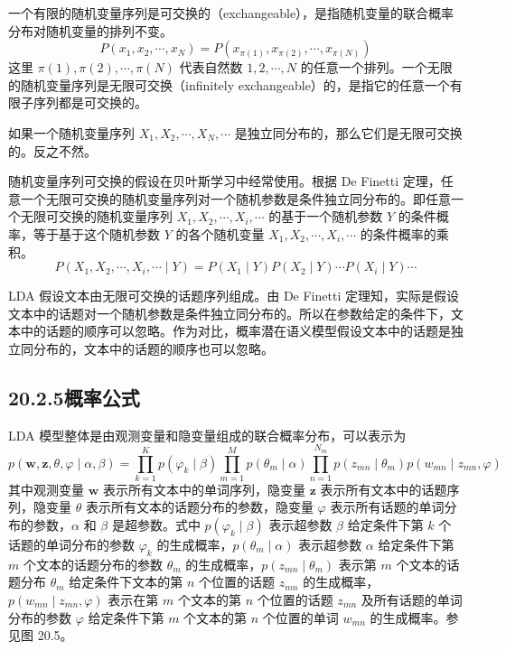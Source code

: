 \documentclass[UTF8,12pt,a4paper,fontset=fandol]{ctexart}
\begin{document}
一个有限的随机变量序列是可交换的（exchangeable），是指随机变量的联合概率分布对随机变量的排列不变。
\begin{equation}
P(x_1,x_2,\cdots,x_N)=P(x_{\pi(1)},x_{\pi(2)},\cdots,x_{\pi(N)})
\tag{20.13}
\end{equation}
这里 $\pi(1),\pi(2),\cdots,\pi(N)$ 代表自然数 $1,2,\cdots,N$ 的任意一个排列。一个无限的随机变量序列是无限可交换（infinitely exchangeable）的，是指它的任意一个有限子序列都是可交换的。

如果一个随机变量序列 $X_1,X_2,\cdots,X_N,\cdots$ 是独立同分布的，那么它们是无限可交换的。反之不然。

随机变量序列可交换的假设在贝叶斯学习中经常使用。根据 De Finetti 定理，任意一个无限可交换的随机变量序列对一个随机参数是条件独立同分布的。即任意一个无限可交换的随机变量序列 $X_1,X_2,\cdots,X_i,\cdots$ 的基于一个随机参数 $Y$ 的条件概率，等于基于这个随机参数 $Y$ 的各个随机变量 $X_1,X_2,\cdots,X_i,\cdots$ 的条件概率的乘积。
\begin{equation}
P(X_1,X_2,\cdots,X_i,\cdots\mid Y)=P(X_1\mid Y)P(X_2\mid Y)\cdots P(X_i\mid Y)\cdots
\tag{20.14}
\end{equation}

LDA 假设文本由无限可交换的话题序列组成。由 De Finetti 定理知，实际是假设文本中的话题对一个随机参数是条件独立同分布的。所以在参数给定的条件下，文本中的话题的顺序可以忽略。作为对比，概率潜在语义模型假设文本中的话题是独立同分布的，文本中的话题的顺序也可以忽略。

\subsection*{20.2.5\quad 概率公式}

LDA 模型整体是由观测变量和隐变量组成的联合概率分布，可以表示为
\begin{equation}
p(\mathbf{w},\mathbf{z},\theta,\varphi\mid\alpha,\beta)=\prod_{k=1}^K p(\varphi_k\mid\beta)\prod_{m=1}^M p(\theta_m\mid\alpha)\prod_{n=1}^{N_m}p(z_{mn}\mid\theta_m)p(w_{mn}\mid z_{mn},\varphi)
\tag{20.15}
\end{equation}
其中观测变量 $\mathbf{w}$ 表示所有文本中的单词序列，隐变量 $\mathbf{z}$ 表示所有文本中的话题序列，隐变量 $\theta$ 表示所有文本的话题分布的参数，隐变量 $\varphi$ 表示所有话题的单词分布的参数，$\alpha$ 和 $\beta$ 是超参数。式中 $p(\varphi_k\mid\beta)$ 表示超参数 $\beta$ 给定条件下第 $k$ 个话题的单词分布的参数 $\varphi_k$ 的生成概率，$p(\theta_m\mid\alpha)$ 表示超参数 $\alpha$ 给定条件下第 $m$ 个文本的话题分布的参数 $\theta_m$ 的生成概率，$p(z_{mn}\mid\theta_m)$ 表示第 $m$ 个文本的话题分布 $\theta_m$ 给定条件下文本的第 $n$ 个位置的话题 $z_{mn}$ 的生成概率，$p(w_{mn}\mid z_{mn},\varphi)$ 表示在第 $m$ 个文本的第 $n$ 个位置的话题 $z_{mn}$ 及所有话题的单词分布的参数 $\varphi$ 给定条件下第 $m$ 个文本的第 $n$ 个位置的单词 $w_{mn}$ 的生成概率。参见图 20.5。
\end{document}
